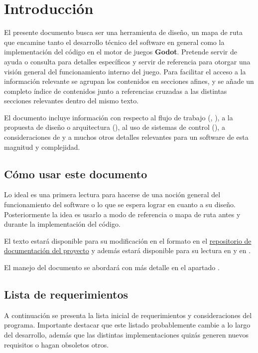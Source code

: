
\section{Introducción}\label{intro:introduccion}

El presente documento busca ser una herramienta de diseño, un mapa de ruta que encamine tanto el desarrollo técnico del software en general como la implementación del código en el motor de juegos \textbf{Godot}. Pretende servir de ayuda o consulta para detalles específicos y servir de referencia para otorgar una visión general del funcionamiento interno del juego. Para facilitar el acceso a la información relevante se agrupan los contenidos en secciones afines, y se añade un completo índice de contenidos junto a referencias cruzadas a las distintas secciones relevantes dentro del mismo texto.

El documento incluye información con respecto al flujo de trabajo (, ), a la propuesta de diseño o arquitectura (), al uso de sistemas de control  (), a consideraciones de  y a muchos otros detalles relevantes para un software de esta magnitud y complejidad.

\subsection{Cómo usar este documento}\label{intro:como-usar-el-documento}
Lo ideal es una primera lectura para hacerse de una noción general del funcionamiento del software o lo que se espera lograr en cuanto a su diseño. Posteriormente la idea es usarlo a modo de referencia o mapa de ruta antes y durante la implementación del código.

El texto estará disponible para su modificación en el formato  en el \href{https://github.com/polirritmico/Bakumapu-docs}{repositorio de documentación del proyecto} y además estará disponible para su lectura en \href{https://polirritmico.github.io/Bakumapu-docs/}{} y en \href{https://github.com/polirritmico/Bakumapu-docs/blob/main/main.pdf}{}.

El manejo del documento se abordará con más detalle en el apartado .

\subsection{Lista de requerimientos}\label{intro:lista-de-requerimientos}
A continuación se presenta la lista inicial de requerimientos y consideraciones del programa. Importante destacar que este listado probablemente cambie a lo largo del desarrollo, además que las distintas implementaciones quizás generen nuevos requisitos o hagan obsoletos otros.

